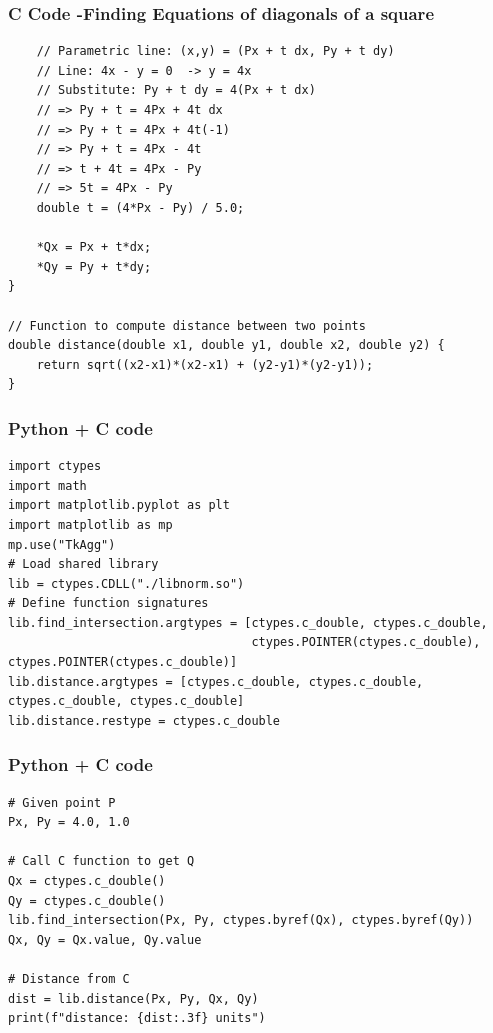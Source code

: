 \documentclass{beamer}
\begin{document}
\begin{frame}[fragile]
    \frametitle{C Code -Finding Equations of diagonals of a square}

    \begin{lstlisting}
    // Parametric line: (x,y) = (Px + t dx, Py + t dy)
    // Line: 4x - y = 0  -> y = 4x
    // Substitute: Py + t dy = 4(Px + t dx)
    // => Py + t = 4Px + 4t dx
    // => Py + t = 4Px + 4t(-1)
    // => Py + t = 4Px - 4t
    // => t + 4t = 4Px - Py
    // => 5t = 4Px - Py
    double t = (4*Px - Py) / 5.0;

    *Qx = Px + t*dx;
    *Qy = Py + t*dy;
}

// Function to compute distance between two points
double distance(double x1, double y1, double x2, double y2) {
    return sqrt((x2-x1)*(x2-x1) + (y2-y1)*(y2-y1));
}
    \end{lstlisting}
\end{frame}

\begin{frame}[fragile]
    \frametitle{Python + C code}

    \begin{lstlisting}
import ctypes
import math
import matplotlib.pyplot as plt
import matplotlib as mp
mp.use("TkAgg")
# Load shared library
lib = ctypes.CDLL("./libnorm.so")
# Define function signatures
lib.find_intersection.argtypes = [ctypes.c_double, ctypes.c_double,
                                  ctypes.POINTER(ctypes.c_double), ctypes.POINTER(ctypes.c_double)]
lib.distance.argtypes = [ctypes.c_double, ctypes.c_double, ctypes.c_double, ctypes.c_double]
lib.distance.restype = ctypes.c_double
    \end{lstlisting}
\end{frame}

\begin{frame}[fragile]
    \frametitle{Python + C code}

    \begin{lstlisting}
# Given point P
Px, Py = 4.0, 1.0

# Call C function to get Q
Qx = ctypes.c_double()
Qy = ctypes.c_double()
lib.find_intersection(Px, Py, ctypes.byref(Qx), ctypes.byref(Qy))
Qx, Qy = Qx.value, Qy.value

# Distance from C
dist = lib.distance(Px, Py, Qx, Qy)
print(f"distance: {dist:.3f} units")

    \end{lstlisting}
\end{frame}
\end{document}
